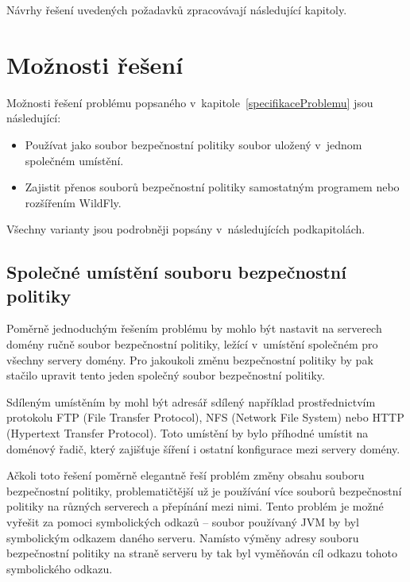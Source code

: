 Návrhy řešení uvedených požadavků zpracovávají následující kapitoly.

\section{Možnosti řešení} \label{vycetMoznostiReseni}

Možnosti řešení problému popsaného v~kapitole~\ref{specifikaceProblemu} jsou následující:

\begin{itemize}
  \item Používat jako soubor bezpečnostní politiky soubor uložený v~jednom společném umístění.
  \item Zajistit přenos souborů bezpečnostní politiky samostatným programem nebo rozšířením WildFly.
\end{itemize}

Všechny varianty jsou podrobněji popsány v~následujících podkapitolách.

\subsection{Společné umístění souboru bezpečnostní politiky} \label{reseniSpolecne}

Poměrně jednoduchým řešením problému by mohlo být nastavit na serverech domény ručně soubor bezpečnostní politiky, ležící v~umístění společném pro všechny servery domény.
Pro jakoukoli změnu bezpečnostní politiky by pak stačilo upravit tento jeden společný soubor bezpečnostní politiky.

Sdíleným umístěním by mohl být adresář sdílený například prostřednictvím protokolu FTP (File Transfer Protocol), NFS (Network File System) nebo HTTP (Hypertext Transfer Protocol).
Toto umístění by bylo příhodné umístit na doménový řadič, který zajišťuje šíření i ostatní konfigurace mezi servery domény.

Ačkoli toto řešení poměrně elegantně řeší problém změny obsahu souboru bezpečnostní politiky, problematičtější už je používání více souborů bezpečnostní politiky na různých serverech a přepínání mezi nimi.
Tento problém je možné vyřešit za pomoci symbolických odkazů -- soubor používaný JVM by byl symbolickým odkazem daného serveru.
Namísto výměny adresy souboru bezpečnostní politiky na straně serveru by tak byl vyměňován cíl odkazu tohoto symbolického odkazu.

